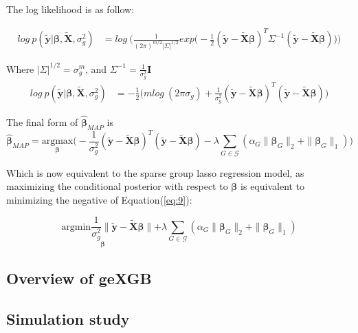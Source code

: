 \documentclass[11pt]{article}
\theoremstyle{plain}
\theoremstyle{definition}
\theoremstyle{remark}
\begin{document}
The log likelihood is as follow:

\begin{equation*}
\begin{aligned}
log\ p(\bm{\tilde{y}}|\bm{\beta},\bm{\tilde{X}},\sigma_g^2)&=log\ \Bigg(\frac{1}{(2\pi)^{m/2}|\Sigma|^{1/2}}exp\Big(-\frac{1}{2}(\bm{\tilde{y}}-\bm{\tilde{X}\beta})^T\Sigma^{-1}(\bm{\tilde{y}}-\bm{\tilde{X}\beta})\Big)\Bigg)
\end{aligned}
\end{equation*}

Where $|\Sigma|^{1/2}=\sigma_g^m$, and $\Sigma^{-1}=\frac{1}{\sigma_g^2}\bm{I}$
\begin{equation*}
\begin{aligned}
log\ p(\bm{\tilde{y}}|\bm{\beta},\bm{\tilde{X}},\sigma_g^2)&=-\frac{1}{2}\Big(mlog\ (2\pi\sigma_g)+\frac{1}{\sigma_g^2}(\bm{\tilde{y}}-\bm{\tilde{X}\beta})^T(\bm{\tilde{y}}-\bm{\tilde{X}\beta})\Big)
\end{aligned}
\end{equation*}

The final form of $\hat{\bm\beta}_{MAP}$ is
\begin{equation}
\label{eq:9}
\hat{\bm\beta}_{MAP}=\underset{\bm{\beta}}{\mathrm{argmax}}\Big(-\frac{1}{\sigma_g^2}(\bm{\tilde{y}}-\bm{\tilde{X}\beta})^T(\bm{\tilde{y}}-\bm{\tilde{X}\beta})-\lambda\sum_{G\in\mathcal{G}}(\alpha_G\parallel\bm{\beta}_G\parallel_2+\parallel\bm{\beta}_G\parallel_1)\Big)
\end{equation}

Which is now equivalent to the sparse group lasso regression model, as maximizing the conditional posterior with respect to $\bm{\beta}$ is equivalent to minimizing the negative of Equation(\ref{eq:9}):

\begin{equation}
\underset{\bm{\beta}}{\mathrm{argmin}\frac{1}{\sigma_g^2}\parallel\bm{\tilde{y}}-\bm{\tilde{X}\beta}}\parallel+\lambda\sum_{G\in\mathcal{G}}(\alpha_G\parallel\bm{\beta}_G\parallel_2+\parallel\bm{\beta}_G\parallel_1)
\end{equation}
\subsection{Overview of geXGB}






\subsection{Simulation study}
\end{document}
